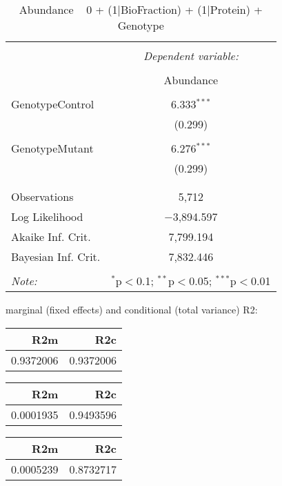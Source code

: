 \documentclass[11pt]{report}
\begin{document}
\begin{table}[!htbp] \centering 
  \caption{Abundance ~ 0 + (1|BioFraction) + (1|Protein) + Genotype} 
  \label{} 
\begin{tabular}{@{\extracolsep{5pt}}lc} 
\\[-1.8ex]\hline 
\hline \\[-1.8ex] 
 & \multicolumn{1}{c}{\textit{Dependent variable:}} \\ 
\cline{2-2} 
\\[-1.8ex] & Abundance \\ 
\hline \\[-1.8ex] 
 GenotypeControl & 6.333$^{***}$ \\ 
  & (0.299) \\ 
  & \\ 
 GenotypeMutant & 6.276$^{***}$ \\ 
  & (0.299) \\ 
  & \\ 
\hline \\[-1.8ex] 
Observations & 5,712 \\ 
Log Likelihood & $-$3,894.597 \\ 
Akaike Inf. Crit. & 7,799.194 \\ 
Bayesian Inf. Crit. & 7,832.446 \\ 
\hline 
\hline \\[-1.8ex] 
\textit{Note:}  & \multicolumn{1}{r}{$^{*}$p$<$0.1; $^{**}$p$<$0.05; $^{***}$p$<$0.01} \\ 
\end{tabular} 
\end{table} 
marginal (fixed effects) and conditional (total variance) R2:

\begin{tabular}{r|r}
\hline
R2m & R2c\\
\hline
0.9372006 & 0.9372006\\
\hline
\end{tabular}

\begin{tabular}{r|r}
\hline
R2m & R2c\\
\hline
0.0001935 & 0.9493596\\
\hline
\end{tabular}

\begin{tabular}{r|r}
\hline
R2m & R2c\\
\hline
0.0005239 & 0.8732717\\
\hline
\end{tabular}
\end{document}
